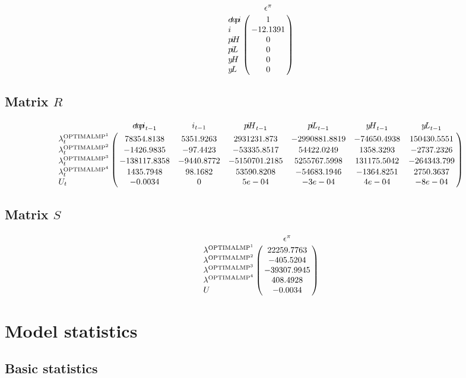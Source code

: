 $$\bordermatrix{
~ & \epsilon^{\pi} \cr
{e\!t\!a\!p\!i} & 1 \cr
i & -12.1391 \cr
{p\!i\!H} & 0 \cr
{p\!i\!L} & 0 \cr
{y\!H} & 0 \cr
{y\!L} & 0 \cr
}$$

\subsection*{Matrix $R$}

$$\bordermatrix{
~ & {e\!t\!a\!p\!i}_{t-1} & i_{t-1} & {p\!i\!H}_{t-1} & {p\!i\!L}_{t-1} & {y\!H}_{t-1} & {y\!L}_{t-1} \cr
\lambda^{\mathrm{OPTIMALMP}^{\mathrm{1}}}_{t} & 78354.8138 & 5351.9263 & 2931231.873 & -2990881.8819 & -74650.4938 & 150430.5551 \cr
\lambda^{\mathrm{OPTIMALMP}^{\mathrm{2}}}_{t} & -1426.9835 & -97.4423 & -53335.8517 & 54422.0249 & 1358.3293 & -2737.2326 \cr
\lambda^{\mathrm{OPTIMALMP}^{\mathrm{3}}}_{t} & -138117.8358 & -9440.8772 & -5150701.2185 & 5255767.5998 & 131175.5042 & -264343.799 \cr
\lambda^{\mathrm{OPTIMALMP}^{\mathrm{4}}}_{t} & 1435.7948 & 98.1682 & 53590.8208 & -54683.1946 & -1364.8251 & 2750.3637 \cr
U_{t} & -0.0034 & 0 & 5e-04 & -3e-04 & 4e-04 & -8e-04 \cr
}$$

\subsection*{Matrix $S$}

$$\bordermatrix{
~ & \epsilon^{\pi} \cr
\lambda^{\mathrm{OPTIMALMP}^{\mathrm{1}}} & 22259.7763 \cr
\lambda^{\mathrm{OPTIMALMP}^{\mathrm{2}}} & -405.5204 \cr
\lambda^{\mathrm{OPTIMALMP}^{\mathrm{3}}} & -39307.9945 \cr
\lambda^{\mathrm{OPTIMALMP}^{\mathrm{4}}} & 408.4928 \cr
U & -0.0034 \cr
}$$


\section{Model statistics}

\subsection{Basic statistics}

